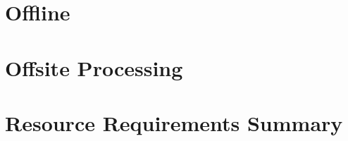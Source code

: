 \documentclass[12pt,twoside]{article}
\begin{document}
\section {Offline}
\label{sec:offline}


\section {Offsite Processing}
\label{sec:offsite}


\section {Resource Requirements Summary}
\label{sec:resources}





%

%

\listoftodos[To Do]



\end{document}
